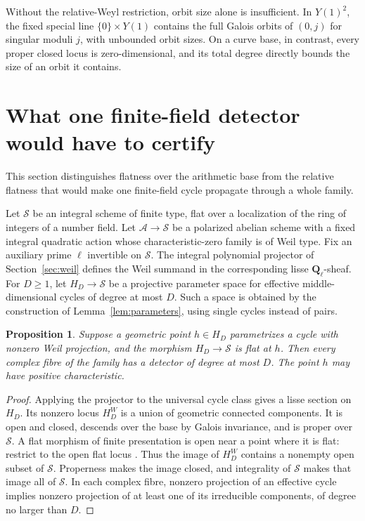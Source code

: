 \documentclass[11pt]{article}
\newtheorem{proposition}[theorem]{Proposition}
\theoremstyle{definition}
\theoremstyle{remark}
\newcommand{\Q}{\mathbf Q}
\begin{document}
Without the relative-Weyl restriction, orbit size alone is insufficient. In $Y(1)^2$, the fixed special line $\{0\}\times Y(1)$ contains the full Galois orbits of $(0,j)$ for singular moduli $j$, with unbounded orbit sizes. On a curve base, in contrast, every proper closed locus is zero-dimensional, and its total degree directly bounds the size of an orbit it contains.
\section{What one finite-field detector would have to certify}
\label{sec:one-prime}
This section distinguishes flatness over the arithmetic base from the relative flatness that would make one finite-field cycle propagate through a whole family.

Let $\mathcal S$ be an integral scheme of finite type, flat over a localization of the ring of integers of a number field. Let $\mathcal A\to\mathcal S$ be a polarized abelian scheme with a fixed integral quadratic action whose characteristic-zero family is of Weil type. Fix an auxiliary prime $\ell$ invertible on $\mathcal S$. The integral polynomial projector of Section~\ref{sec:weil} defines the Weil summand in the corresponding lisse $\Q_\ell$-sheaf. For $D\ge1$, let $H_D\to\mathcal S$ be a projective parameter space for effective middle-dimensional cycles of degree at most $D$. Such a space is obtained by the construction of Lemma~\ref{lem:parameters}, using single cycles instead of pairs.

\begin{proposition}\label{prop:flat-detector-witness}
Suppose a geometric point $h\in H_D$ parametrizes a cycle with nonzero Weil projection, and the morphism $H_D\to\mathcal S$ is flat at $h$. Then every complex fibre of the family has a detector of degree at most $D$. The point $h$ may have positive characteristic.
\end{proposition}

\begin{proof}
Applying the projector to the universal cycle class gives a lisse section on $H_D$. Its nonzero locus $H_D^{W}$ is a union of geometric connected components. It is open and closed, descends over the base by Galois invariance, and is proper over $\mathcal S$. A flat morphism of finite presentation is open near a point where it is flat: restrict to the open flat locus \cite[Theorems~2.4.6 and 11.1.1]{EGAIV}. Thus the image of $H_D^{W}$ contains a nonempty open subset of $\mathcal S$. Properness makes the image closed, and integrality of $\mathcal S$ makes that image all of $\mathcal S$. In each complex fibre, nonzero projection of an effective cycle implies nonzero projection of at least one of its irreducible components, of degree no larger than $D$.
\end{proof}
\end{document}

